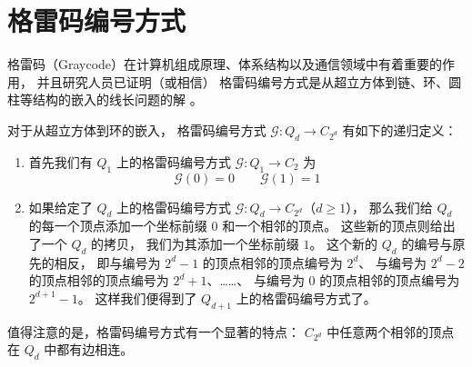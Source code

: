 \section{格雷码编号方式}
\label{Section 2.3}

格雷码（Graycode）在计算机组成原理、体系结构以及通信领域中有着重要的作用，
并且研究人员已证明（或相信）
格雷码编号方式是从超立方体到链、环、圆柱等结构的嵌入的线长问题的解
\cite{Harper.1964,Guu.1997,Manuel.2011}。

对于从超立方体到环的嵌入，
格雷码编号方式 $\mathcal{G} \colon Q_d \rightarrow C_{2^d}$ 有如下的递归定义：
\begin{enumerate}[(1)]
	\item 首先我们有 $Q_1$ 上的格雷码编号方式
		$\mathcal{G} \colon Q_1 \rightarrow C_2$ 为
		\begin{equation*}
		\mathcal{G}(0) = 0 \qquad \mathcal{G}(1) = 1
		\end{equation*}
	\item 如果给定了 $Q_d$ 上的格雷码编号方式
		$\mathcal{G} \colon Q_d \rightarrow C_{2^d}$（$d \ge 1$），
		那么我们给 $Q_d$ 的每一个顶点添加一个坐标前缀 $0$ 和一个相邻的顶点。
		这些新的顶点则给出了一个 $Q_d$ 的拷贝，
		我们为其添加一个坐标前缀 $1$。
		这个新的 $Q_d$ 的编号与原先的相反，
		即与编号为 $2^d - 1$ 的顶点相邻的顶点编号为 $2^d$、
		与编号为 $2^d - 2$ 的顶点相邻的顶点编号为 $2^d + 1$、……、
		与编号为 $0$ 的顶点相邻的顶点编号为 $2^{d + 1} - 1$。
		这样我们便得到了 $Q_{d + 1}$ 上的格雷码编号方式了。
\end{enumerate}
值得注意的是，格雷码编号方式有一个显著的特点：
$C_{2^d}$ 中任意两个相邻的顶点在 $Q_d$ 中都有边相连。
